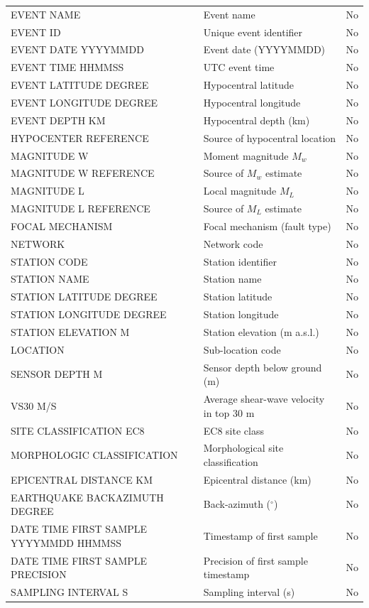 \begin{longtable}{
  >{\raggedright\arraybackslash}p{4cm}  >{\raggedright\arraybackslash}p{8cm}  >{\centering\arraybackslash}p{2cm}
}
EVENT NAME & Event name & No \\
EVENT ID & Unique event identifier & No \\
EVENT DATE YYYYMMDD & Event date (YYYYMMDD) & No \\
EVENT TIME HHMMSS & UTC event time & No \\
EVENT LATITUDE DEGREE & Hypocentral latitude & No \\
EVENT LONGITUDE DEGREE & Hypocentral longitude & No \\
EVENT DEPTH KM & Hypocentral depth (km) & No \\
HYPOCENTER REFERENCE & Source of hypocentral location & No \\
MAGNITUDE W & Moment magnitude $M_w$ & No \\
MAGNITUDE W REFERENCE & Source of $M_w$ estimate & No \\
MAGNITUDE L & Local magnitude $M_L$ & No \\
MAGNITUDE L REFERENCE & Source of $M_L$ estimate & No \\
FOCAL MECHANISM & Focal mechanism (fault type) & No \\
NETWORK & Network code & No \\
STATION CODE & Station identifier & No \\
STATION NAME & Station name & No \\
STATION LATITUDE DEGREE & Station latitude & No \\
STATION LONGITUDE DEGREE & Station longitude & No \\
STATION ELEVATION M & Station elevation (m a.s.l.) & No \\
LOCATION & Sub-location code & No \\
SENSOR DEPTH M & Sensor depth below ground (m) & No \\
VS30 M/S & Average shear-wave velocity in top 30 m & No \\
SITE CLASSIFICATION EC8 & EC8 site class & No \\
MORPHOLOGIC CLASSIFICATION & Morphological site classification & No \\
EPICENTRAL DISTANCE KM & Epicentral distance (km) & No \\
EARTHQUAKE BACKAZIMUTH DEGREE & Back-azimuth ($^\circ$) & No \\
DATE TIME FIRST SAMPLE YYYYMMDD HHMMSS & Timestamp of first sample & No \\
DATE TIME FIRST SAMPLE PRECISION & Precision of first sample timestamp & No \\
SAMPLING INTERVAL S & Sampling interval (s) & No \\

\end{longtable}
